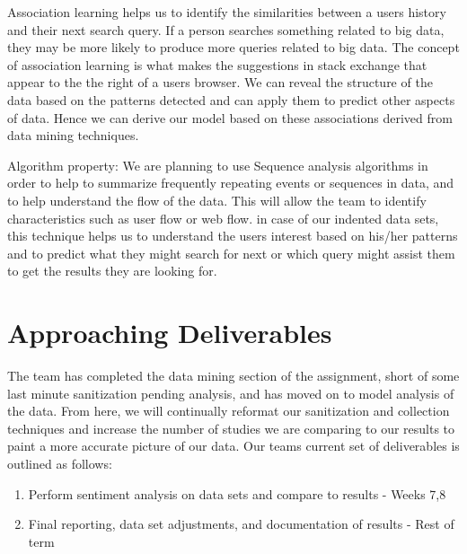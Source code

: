 \documentclass{sig-alternate}
\begin{document}
Association learning helps us to identify the similarities between a user\textsc{}s history and their next search query. If a person searches something related to big data, they may be more likely to produce more queries related to big data. The concept of association learning is what makes the suggestions in stack exchange that appear to the the right of a user\textsc{}s browser. We can reveal the structure of the data based on the patterns detected and can apply them to predict other aspects of data. Hence we can derive our model based on these associations derived from data mining techniques. 

Algorithm property:
We are planning to use Sequence analysis algorithms in order to help to summarize frequently repeating events or sequences in data, and to help understand the flow of the data. This will allow the team to identify characteristics such as user flow or web flow. in case of our indented data sets, this technique helps us to understand the user\textsc{}s interest based on his/her patterns and to predict what they might search for next or which query might assist them to get the results they are looking for. 

\section{Approaching Deliverables}
\label{Approaching Deliverables}

The team has completed the data mining section of the assignment, short of some last minute sanitization pending analysis, and has moved on to model analysis of the data. From here, we will continually reformat our sanitization and collection techniques and increase the number of studies we are comparing to our results to paint a more accurate picture of our data. Our team\textsc{}s current set of deliverables is outlined as follows: 

\begin{enumerate}
\item Perform sentiment analysis on data sets and compare to results - Weeks 7,8
\item Final reporting, data set adjustments, and documentation of results - Rest of term
\end{enumerate}
\end{document}
